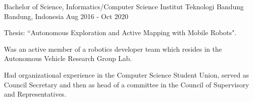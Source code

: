 

\begin{cventries}

  \cventry
    {Bachelor of Science, Informatics/Computer Science} %
    {Institut Teknologi Bandung} %
    {Bandung, Indonesia} %
    {Aug 2016 - Oct 2020} %
    {
   	  \begin{cvitems}
		  \item {Thesis: ``Autonomous Exploration and Active Mapping with Mobile Robots".}
          \item {Was an active member of a robotics developer team which resides in the Autonomous Vehicle Research Group Lab.}
          \item {Had organizational experience in the Computer Science Student Union, served as Council Secretary and then as head of a committee in the Council of Supervisory and Representatives.}
   	  \end{cvitems}
    }

\end{cventries}
